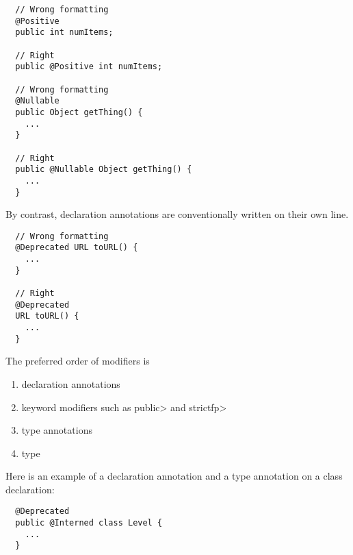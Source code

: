 \begin{Verbatim}
  // Wrong formatting
  @Positive
  public int numItems;

  // Right
  public @Positive int numItems;

  // Wrong formatting
  @Nullable
  public Object getThing() {
    ...
  }

  // Right
  public @Nullable Object getThing() {
    ...
  }
\end{Verbatim}

By contrast, declaration annotations are conventionally written on their own line.

\begin{Verbatim}
  // Wrong formatting
  @Deprecated URL toURL() {
    ...
  }

  // Right
  @Deprecated
  URL toURL() {
    ...
  }
\end{Verbatim}

The preferred order of modifiers is
\begin{enumerate}
\item declaration annotations
\item keyword modifiers such as \<public> and \<strictfp>
\item type annotations
\item type
\end{enumerate}

Here is an example of a declaration annotation and a type annotation on a class declaration:

\begin{Verbatim}
  @Deprecated
  public @Interned class Level {
    ...
  }
\end{Verbatim}

%
%
%
%

